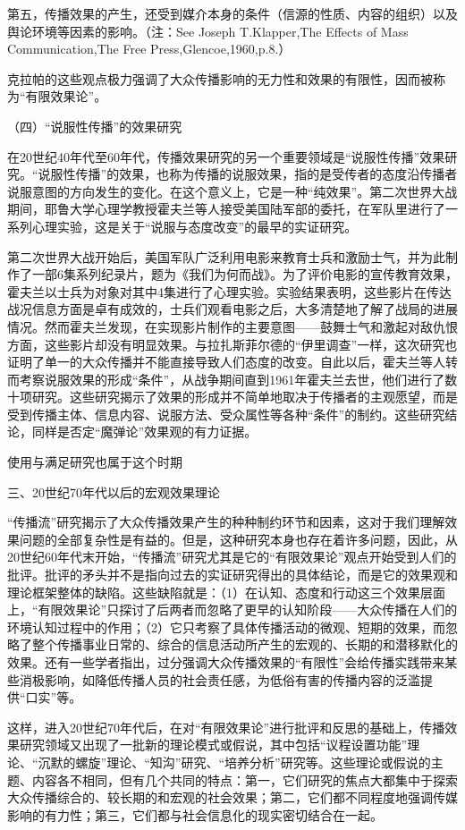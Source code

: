 \documentclass[UTF8,12pt]{ctexart}
\numberwithin{equation}{section} %
\numberwithin{figure}{section}
\numberwithin{table}{section}
\begin{document}
	第五，传播效果的产生，还受到媒介本身的条件（信源的性质、内容的组织）以及舆论环境等因素的影响。（注：See Joseph T.Klapper,The Effects of Mass Communication,The Free Press,Glencoe,1960,p.8.）
	
	克拉帕的这些观点极力强调了大众传播影响的无力性和效果的有限性，因而被称为“有限效果论”。
	
	（四）“说服性传播”的效果研究
	
	在20世纪40年代至60年代，传播效果研究的另一个重要领域是“说服性传播”效果研究。“说服性传播”的效果，也称为传播的说服效果，指的是受传者的态度沿传播者说服意图的方向发生的变化。在这个意义上，它是一种“纯效果”。第二次世界大战期间，耶鲁大学心理学教授霍夫兰等人接受美国陆军部的委托，在军队里进行了一系列心理实验，这是关于“说服与态度改变”的最早的实证研究。
	
	第二次世界大战开始后，美国军队广泛利用电影来教育士兵和激励士气，并为此制作了一部6集系列纪录片，题为《我们为何而战》。为了评价电影的宣传教育效果，霍夫兰以士兵为对象对其中4集进行了心理实验。实验结果表明，这些影片在传达战况信息方面是卓有成效的，士兵们观看电影之后，大多清楚地了解了战局的进展情况。然而霍夫兰发现，在实现影片制作的主要意图——鼓舞士气和激起对敌仇恨方面，这些影片却没有明显效果。与拉扎斯菲尔德的“伊里调查”一样，这次研究也证明了单一的大众传播并不能直接导致人们态度的改变。自此以后，霍夫兰等人转而考察说服效果的形成“条件”，从战争期间直到1961年霍夫兰去世，他们进行了数十项研究。这些研究揭示了效果的形成并不简单地取决于传播者的主观愿望，而是受到传播主体、信息内容、说服方法、受众属性等各种“条件”的制约。这些研究结论，同样是否定“魔弹论”效果观的有力证据。
	
	使用与满足研究也属于这个时期
	
	三、20世纪70年代以后的宏观效果理论
	
	“传播流”研究揭示了大众传播效果产生的种种制约环节和因素，这对于我们理解效果问题的全部复杂性是有益的。但是，这种研究本身也存在着许多问题，因此，从20世纪60年代末开始，“传播流”研究尤其是它的“有限效果论”观点开始受到人们的批评。批评的矛头并不是指向过去的实证研究得出的具体结论，而是它的效果观和理论框架整体的缺陷。这些缺陷就是：（1）在认知、态度和行动这三个效果层面上，“有限效果论”只探讨了后两者而忽略了更早的认知阶段——大众传播在人们的环境认知过程中的作用；（2）它只考察了具体传播活动的微观、短期的效果，而忽略了整个传播事业日常的、综合的信息活动所产生的宏观的、长期的和潜移默化的效果。还有一些学者指出，过分强调大众传播效果的“有限性”会给传播实践带来某些消极影响，如降低传播人员的社会责任感，为低俗有害的传播内容的泛滥提供“口实”等。
	
	这样，进入20世纪70年代后，在对“有限效果论”进行批评和反思的基础上，传播效果研究领域又出现了一批新的理论模式或假说，其中包括“议程设置功能”理论、“沉默的螺旋”理论、“知沟”研究、“培养分析”研究等。这些理论或假说的主题、内容各不相同，但有几个共同的特点：第一，它们研究的焦点大都集中于探索大众传播综合的、较长期的和宏观的社会效果；第二，它们都不同程度地强调传媒影响的有力性；第三，它们都与社会信息化的现实密切结合在一起。
	
\end{document}
